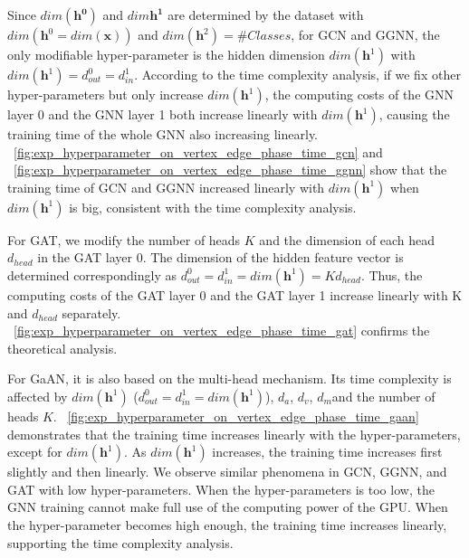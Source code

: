 Since $dim(\boldsymbol{h^0})$ and $dim{\boldsymbol{h^1}}$ are determined by the dataset with $dim(\boldsymbol{h}^0=dim(\boldsymbol{x}))$ and $dim(\boldsymbol{h}^2)=\#Classes$,
for GCN and GGNN, the only modifiable hyper-parameter is the hidden dimension $dim(\boldsymbol{h}^1)$ with $dim(\boldsymbol{h}^1) = d^0_{out} = d^1_{in}$.
According to the time complexity analysis, if we fix other hyper-parameters but only increase $dim(\boldsymbol{h}^1)$, the computing costs of the GNN layer 0 and the GNN layer 1 both increase linearly with $dim(\boldsymbol{h}^1)$, causing the training time of the whole GNN also increasing linearly. 
\figurename~\ref{fig:exp_hyperparameter_on_vertex_edge_phase_time_gcn} and \figurename~\ref{fig:exp_hyperparameter_on_vertex_edge_phase_time_ggnn} show that the training time of GCN and GGNN increased linearly with $dim(\boldsymbol{h}^1)$ when $dim(\boldsymbol{h}^1)$ is big, consistent with the time complexity analysis.

For GAT, we modify the number of heads $K$ and the dimension of each head $d_{head}$ in the GAT layer 0.
The dimension of the hidden feature vector is determined correspondingly as $d^0_{out} = d^1_{in} = dim(\boldsymbol{h}^1) = K d_{head}$.
Thus, the computing costs of the GAT layer 0 and the GAT layer 1 increase linearly with K and $d_{head}$ separately. 
\figurename~\ref{fig:exp_hyperparameter_on_vertex_edge_phase_time_gat} confirms the theoretical analysis.

For GaAN, it is also based on the multi-head mechanism.
Its time complexity is affected by $dim(\boldsymbol{h}^1)$ ($d^0_{out} = d^1_{in} = dim(\boldsymbol{h}^1)$), $d_a$, $d_v$, $d_m$and the number of heads $K$.
\figurename~\ref{fig:exp_hyperparameter_on_vertex_edge_phase_time_gaan} demonstrates that the training time increases linearly with the hyper-parameters, except for $dim(\boldsymbol{h}^1)$.
As $dim(\boldsymbol{h}^1)$ increases, the training time increases first slightly and then linearly.
We observe similar phenomena in GCN, GGNN, and GAT with low hyper-parameters.
When the hyper-parameters is too low, the GNN training cannot make full use of the computing power of the GPU.
When the hyper-parameter becomes high enough, the training time increases linearly, supporting the time complexity analysis.


